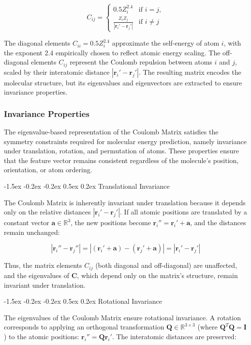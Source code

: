 \documentclass{article}
\makeatletter
\newcounter{subsubsubsection}[subsubsection]
\newcommand\subsubsubsection{\@startsection{subsubsubsection}{4}{\z@}%
    {-1.5ex \@plus -0.2ex \@minus -0.2ex}%
    {0.5ex \@plus 0.2ex}%
    {\normalfont\normalsize\bfseries}}%
\makeatother
\begin{document}
\[
C_{ij} =
\begin{cases} 
0.5 Z_i^{2.4} & \text{if } i = j, \\
\frac{Z_i Z_j}{|\mathbf{r}_i' - \mathbf{r}_j'|} & \text{if } i \neq j
\end{cases}
\]

The diagonal elements \( C_{ii} = 0.5 Z_i^{2.4} \) approximate the self-energy of atom \( i \), with the exponent 2.4 empirically chosen to reflect atomic energy scaling. The off-diagonal elements \( C_{ij} \) represent the Coulomb repulsion between atoms \( i \) and \( j \), scaled by their interatomic distance \( |\mathbf{r}_i' - \mathbf{r}_j'| \). The resulting matrix encodes the molecular structure, but its eigenvalues and eigenvectors are extracted to ensure invariance properties.

\subsubsection{Invariance Properties}

The eigenvalue-based representation of the Coulomb Matrix satisfies the symmetry constraints required for molecular energy prediction, namely invariance under translation, rotation, and permutation of atoms. These properties ensure that the feature vector remains consistent regardless of the molecule’s position, orientation, or atom ordering.

\subsubsubsection{Translational Invariance}

The Coulomb Matrix is inherently invariant under translation because it depends only on the relative distances \( |\mathbf{r}_i' - \mathbf{r}_j'| \). If all atomic positions are translated by a constant vector \( \mathbf{a} \in \mathbb{R}^3 \), the new positions become \( \mathbf{r}_i'' = \mathbf{r}_i' + \mathbf{a} \), and the distances remain unchanged:

\[
|\mathbf{r}_i'' - \mathbf{r}_j''| = |(\mathbf{r}_i' + \mathbf{a}) - (\mathbf{r}_j' + \mathbf{a})| = |\mathbf{r}_i' - \mathbf{r}_j'|
\]

Thus, the matrix elements \( C_{ij} \) (both diagonal and off-diagonal) are unaffected, and the eigenvalues of \( \mathbf{C} \), which depend only on the matrix’s structure, remain invariant under translation.

\subsubsubsection{Rotational Invariance}

The eigenvalues of the Coulomb Matrix ensure rotational invariance. A rotation corresponds to applying an orthogonal transformation \( \mathbf{Q} \in \mathbb{R}^{3 \times 3} \) (where \( \mathbf{Q}^T \mathbf{Q} = \mathbf{I} \)) to the atomic positions: \( \mathbf{r}_i'' = \mathbf{Q} \mathbf{r}_i' \). The interatomic distances are preserved:
\end{document}
